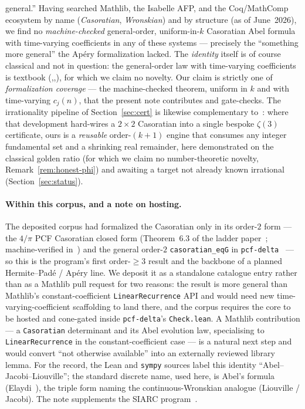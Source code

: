 \documentclass[11pt]{article}
\begin{document}
general.'' Having searched Mathlib, the Isabelle AFP, and the Coq/MathComp ecosystem by
name (\emph{Casoratian}, \emph{Wronskian}) and by structure (as of June~2026), we find no
\emph{machine-checked} general-order, uniform-in-$k$ Casoratian Abel formula with
time-varying coefficients in any of these systems --- precisely the ``something more
general'' the Ap\'ery formalization lacked. The \emph{identity} itself is of course
classical and not in question: the general-order law with time-varying coefficients is
textbook (\cite[Ch.~2]{elaydi},\cite{kelleypeterson},\cite{milnethomson}), for which we
claim no novelty. Our claim is strictly one of \emph{formalization coverage} --- the
machine-checked theorem, uniform in $k$ and with time-varying $c_j(n)$, that the present
note contributes and gate-checks. The irrationality pipeline of
Section~\ref{sec:cert} is likewise complementary to~\cite{apery}: where that development
hard-wires a $2\times2$ Casoratian into a single bespoke $\zeta(3)$ certificate, ours is
a \emph{reusable} order-$(k{+}1)$ engine that consumes any integer fundamental set and a
shrinking real remainder, here demonstrated on the classical golden ratio (for which we
claim no number-theoretic novelty, Remark~\ref{rem:honest-phi}) and awaiting a target
not already known irrational (Section~\ref{sec:status}).

\paragraph{Within this corpus, and a note on hosting.}
The deposited corpus had formalized the Casoratian only in its order-$2$ form --- the
$4/\pi$ PCF Casoratian closed form (Theorem~6.3 of the ladder paper~\cite{ladder};
machine-verified in~\cite{caso2lean}) and the general order-$2$
\texttt{casoratian\_eqG} in \texttt{pcf-delta}~\cite{pcfdelta} --- so this is the
program's first order-$\ge3$ result and the backbone of a planned Hermite--Pad\'e /
Ap\'ery line. We deposit it as a standalone catalogue entry rather than as a Mathlib
pull request for two reasons: the result is more general than Mathlib's
constant-coefficient \texttt{LinearRecurrence} API and would need new
time-varying-coefficient scaffolding to land there, and the corpus requires the core
to be hosted and cone-gated inside \texttt{pcf-delta}'s \texttt{Check.lean}. A Mathlib
contribution --- a \texttt{Casoratian} determinant and its Abel evolution law,
specialising to \texttt{LinearRecurrence} in the constant-coefficient case --- is a
natural next step and would convert ``not otherwise available'' into an externally
reviewed library lemma. For the record, the Lean and \texttt{sympy} sources label this
identity ``Abel--Jacobi--Liouville''; the standard discrete name, used here, is Abel's
formula (Elaydi~\cite{elaydi}), the triple form naming the continuous-Wronskian
analogue (Liouville / Jacobi). The note supplements the SIARC program~\cite{siarc}.
\end{document}
